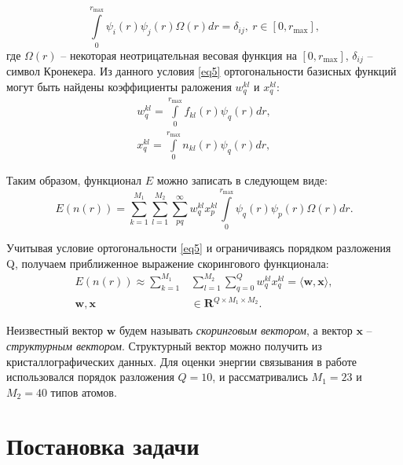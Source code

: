 \documentclass[CEJM,PDF]{Class+Reg_in_Molec_Docking} %
\begin{document}
\begin{equation}\label{eq5}
\int\limits_{0}^{r_{\text{max}}}\psi_i(r)\psi_j(r)\Omega(r)dr = \delta_{ij}, \ r\in[0,r_{\text{max}}],
\end{equation}
где $\Omega(r)$ -- некоторая неотрицательная весовая функция на $[0,r_{\text{max}}]$, $\delta_{ij}$ -- символ Кронекера. Из данного условия \eqref{eq5} ортогональности базисных функций могут быть найдены коэффициенты раложения $w_q^{kl}$ и $x_q^{kl}$:
\begin{equation}\label{eq6}
\begin{split}
w_q^{kl}=\int\limits_{0}^{r_{\text{max}}}f_{kl}(r)\psi_q(r)dr, \\
x_q^{kl}=\int\limits_{0}^{r_{\text{max}}}n_{kl}(r)\psi_q(r)dr,
\end{split}
\end{equation}

Таким образом, функционал $E$ можно записать в следующем виде:
\begin{equation}\label{eq7}
E(n(r)) = \sum_{k=1}^{M_1} \sum_{l=1}^{M_2} \sum_{pq}^{\infty}w_q^{kl}x_p^{kl}\int\limits_{0}^{r_{\text{max}}}\psi_q(r)\psi_p(r)\Omega(r)dr.
\end{equation}

Учитывая условие ортогональности \eqref{eq5} и ограничиваясь порядком разложения Q, получаем приближенное выражение скорингового функционала: 
\begin{equation}\label{eq8}
\begin{split}
E(n(r)) \approx \sum_{k=1}^{M_1} & \sum_{l=1}^{M_2} \sum_{q=0}^{Q}w_q^{kl}x_q^{kl} = \langle\mathbf{w},\mathbf{x}\rangle,\\
\mathbf{w}, \mathbf{x} & \in \mathbf{R}^{Q\times M_1\times M_2}.
\end{split}
\end{equation}

Неизвестный вектор $\mathbf{w}$ будем называть \textit{скоринговым вектором}, а вектор $\mathbf{x}$ -- \textit{структурным вектором}. Структурный вектор можно получить из кристаллографических данных. Для оценки энергии связывания в работе \cite{grudinin2016predicting} использовался порядок разложения $Q=10$, и рассматривались $M_1 = 23$ и $M_2 = 40$ типов атомов.

\section{Постановка задачи}
\end{document}
